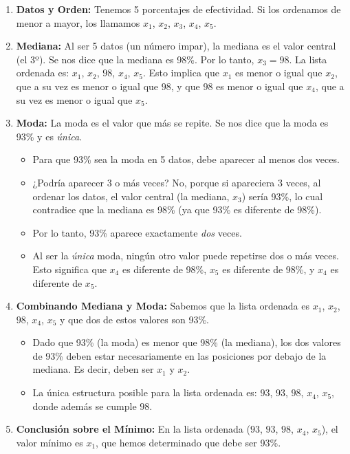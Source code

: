 \documentclass[
]{article}
\providecommand{\tightlist}{%
  \setlength{\itemsep}{0pt}\setlength{\parskip}{0pt}}
\begin{document}
\begin{enumerate}
\def\labelenumi{\arabic{enumi}.}
\item
  \textbf{Datos y Orden:} Tenemos 5 porcentajes de efectividad. Si los
  ordenamos de menor a mayor, los llamamos \(x_1\), \(x_2\), \(x_3\),
  \(x_4\), \(x_5\).
\item
  \textbf{Mediana:} Al ser 5 datos (un número impar), la mediana es el
  valor central (el 3º). Se nos dice que la mediana es 98\%. Por lo
  tanto, \(x_3 = 98%
  \). La lista ordenada es: \(x_1\), \(x_2\), \(98%
  \), \(x_4\), \(x_5\). Esto implica que \(x_1\) es menor o igual que
  \(x_2\), que a su vez es menor o igual que \(98%
  \), y que \(98%
  \) es menor o igual que \(x_4\), que a su vez es menor o igual que
  \(x_5\).
\item
  \textbf{Moda:} La moda es el valor que más se repite. Se nos dice que
  la moda es 93\% y es \emph{única}.

  \begin{itemize}
  \tightlist
  \item
    Para que 93\% sea la moda en 5 datos, debe aparecer al menos dos
    veces.
  \item
    ¿Podría aparecer 3 o más veces? No, porque si apareciera 3 veces, al
    ordenar los datos, el valor central (la mediana, \(x_3\)) sería
    93\%, lo cual contradice que la mediana es 98\% (ya que 93\% es
    diferente de 98\%).
  \item
    Por lo tanto, 93\% aparece exactamente \emph{dos} veces.
  \item
    Al ser la \emph{única} moda, ningún otro valor puede repetirse dos o
    más veces. Esto significa que \(x_4\) es diferente de 98\%, \(x_5\)
    es diferente de 98\%, y \(x_4\) es diferente de \(x_5\).
  \end{itemize}
\item
  \textbf{Combinando Mediana y Moda:} Sabemos que la lista ordenada es
  \(x_1\), \(x_2\), \(98%
  \), \(x_4\), \(x_5\) y que dos de estos valores son 93\%.

  \begin{itemize}
  \tightlist
  \item
    Dado que 93\% (la moda) es menor que 98\% (la mediana), los dos
    valores de 93\% deben estar necesariamente en las posiciones por
    debajo de la mediana. Es decir, deben ser \(x_1\) y \(x_2\).
  \item
    La única estructura posible para la lista ordenada es: \(93%
    \), \(93%
    \), \(98%
    \), \(x_4\), \(x_5\), donde además se cumple \(98%
    \).
  \end{itemize}
\item
  \textbf{Conclusión sobre el Mínimo:} En la lista ordenada (\(93%
  \), \(93%
  \), \(98%
  \), \(x_4\), \(x_5\)), el valor mínimo es \(x_1\), que hemos
  determinado que debe ser 93\%.
\end{enumerate}
\end{document}
